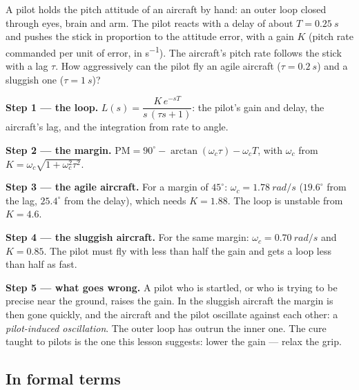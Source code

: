 \begin{example}
\label{ex:inv-pilot}
A pilot holds the pitch attitude of an aircraft by hand: an outer loop closed through eyes, brain and arm. The pilot reacts with a delay of about $T = \SI{0.25}{s}$ and pushes the stick in proportion to the attitude error, with a gain $K$ (pitch rate commanded per unit of error, in \si{s^{-1}}). The aircraft's pitch rate follows the stick with a lag $\tau$. How aggressively can the pilot fly an agile aircraft ($\tau = \SI{0.2}{s}$) and a sluggish one ($\tau = \SI{1}{s}$)?

\textbf{Step 1 — the loop.} $L(s) = \dfrac{K\,e^{-sT}}{s\,(\tau s + 1)}$: the pilot's gain and delay, the aircraft's lag, and the integration from rate to angle.

\textbf{Step 2 — the margin.} $\mathrm{PM} = 90^\circ - \arctan(\omega_c\tau) - \omega_cT$, with $\omega_c$ from $K = \omega_c\sqrt{1 + \omega_c^2\tau^2}$.

\textbf{Step 3 — the agile aircraft.} For a margin of $45^\circ$: $\omega_c = \SI{1.78}{rad/s}$ ($19.6^\circ$ from the lag, $25.4^\circ$ from the delay), which needs $K = 1.88$. The loop is unstable from $K = 4.6$.

\textbf{Step 4 — the sluggish aircraft.} For the same margin: $\omega_c = \SI{0.70}{rad/s}$ and $K = 0.85$. The pilot must fly with less than half the gain and gets a loop less than half as fast.

\textbf{Step 5 — what goes wrong.} A pilot who is startled, or who is trying to be precise near the ground, raises the gain. In the sluggish aircraft the margin is then gone quickly, and the aircraft and the pilot oscillate against each other: a \emph{pilot-induced oscillation}. The outer loop has outrun the inner one. The cure taught to pilots is the one this lesson suggests: lower the gain — relax the grip.
\end{example}

\subsection{In formal terms}

